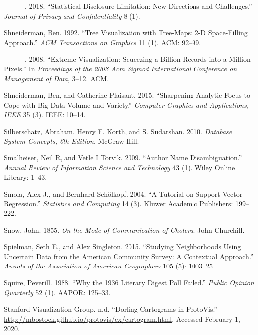 \documentclass[]{krantz}
\begin{document}
\hypertarget{ref-shlomo2018}{}
---------. 2018. ``Statistical Disclosure Limitation: New Directions and
Challenges.'' \emph{Journal of Privacy and Confidentiality} 8 (1).

\hypertarget{ref-shneiderman1992tree}{}
Shneiderman, Ben. 1992. ``Tree Visualization with Tree-Maps: 2-D
Space-Filling Approach.'' \emph{ACM Transactions on Graphics} 11 (1).
ACM: 92--99.

\hypertarget{ref-shneiderman2008extreme}{}
---------. 2008. ``Extreme Visualization: Squeezing a Billion Records
into a Million Pixels.'' In \emph{Proceedings of the 2008 Acm Sigmod
International Conference on Management of Data}, 3--12. ACM.

\hypertarget{ref-shneiderman2015sharpening}{}
Shneiderman, Ben, and Catherine Plaisant. 2015. ``Sharpening Analytic
Focus to Cope with Big Data Volume and Variety.'' \emph{Computer
Graphics and Applications, IEEE} 35 (3). IEEE: 10--14.

\hypertarget{ref-silberschatz2010database}{}
Silberschatz, Abraham, Henry F. Korth, and S. Sudarshan. 2010.
\emph{Database System Concepts, 6th Edition}. McGraw-Hill.

\hypertarget{ref-smalheiser2009author}{}
Smalheiser, Neil R, and Vetle I Torvik. 2009. ``Author Name
Disambiguation.'' \emph{Annual Review of Information Science and
Technology} 43 (1). Wiley Online Library: 1--43.

\hypertarget{ref-SmolaRegression04}{}
Smola, Alex J., and Bernhard Schölkopf. 2004. ``A Tutorial on Support
Vector Regression.'' \emph{Statistics and Computing} 14 (3). Kluwer
Academic Publishers: 199--222.

\hypertarget{ref-snow1855mode}{}
Snow, John. 1855. \emph{On the Mode of Communication of Cholera}. John
Churchill.

\hypertarget{ref-Spielman2015}{}
Spielman, Seth E., and Alex Singleton. 2015. ``Studying Neighborhoods
Using Uncertain Data from the American Community Survey: A Contextual
Approach.'' \emph{Annals of the Association of American Geographers} 105
(5): 1003--25.

\hypertarget{ref-squire19881936}{}
Squire, Peverill. 1988. ``Why the 1936 Literary Digest Poll Failed.''
\emph{Public Opinion Quarterly} 52 (1). AAPOR: 125--33.

\hypertarget{ref-ProtoVis2015}{}
Stanford Visualization Group. n.d. ``Dorling Cartograms in ProtoVis.''
\url{http://mbostock.github.io/protovis/ex/cartogram.html}. Accessed
February 1, 2020.
\end{document}

